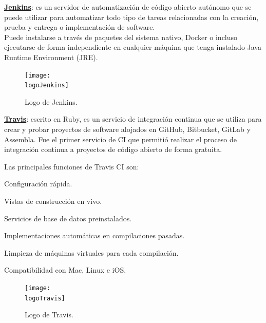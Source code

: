\begin{compactitem}
    \item \textbf{\underline{Jenkins}}: es un servidor de automatización de código abierto autónomo que se puede utilizar para automatizar todo tipo de tareas relacionadas con la creación, prueba y entrega o implementación de software.\\
    Puede instalarse a través de paquetes del sistema nativo, Docker o incluso ejecutarse de forma independiente en cualquier máquina que tenga instalado Java Runtime Environment (JRE).
    \begin{figure}[h]
        \centering
        \texttt{[image: \\logoJenkins]}
        \caption{Logo de Jenkins.}
    \end{figure}
    \item \textbf{\underline{Travis}}: escrito en Ruby, es un servicio de integración continua que se utiliza para crear y probar proyectos de software alojados en GitHub, Bitbucket, GitLab y Assembla. Fue el primer servicio de CI que permitió realizar el proceso de integración continua a proyectos de código abierto de forma gratuita.
    
    Las principales funciones de Travis CI son:
    \begin{compactitem}
        \item Configuración rápida.
        \item Vistas de construcción en vivo.
        \item Servicios de base de datos preinstalados.
        \item Implementaciones automáticas en compilaciones pasadas.
        \item Limpieza de máquinas virtuales para cada compilación.
        \item Compatibilidad con Mac, Linux e iOS.
    \end{compactitem}

    \begin{figure}[h]
        \centering
        \texttt{[image: \\logoTravis]}
        \caption{Logo de Travis.}
    \end{figure}


\end{compactitem}
